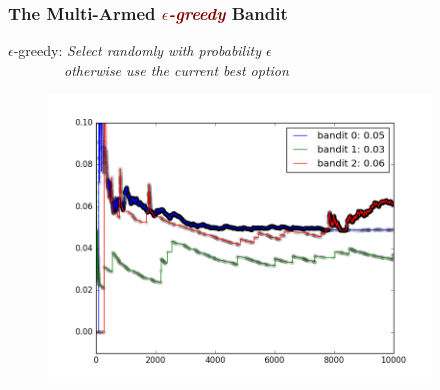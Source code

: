 \documentclass[xcolor={dvipsnames}]{beamer}
\begin{document}
\frame
{
\frametitle{The Multi-Armed  \textcolor{Maroon}{\emph{$\epsilon$-greedy}} Bandit}

$\epsilon$-greedy: \emph{Select randomly with probability $\epsilon$ \\$\quad\quad\quad\quad$otherwise use the current best  option} 

\begin{figure}
\centering
\noindent \includegraphics[height=3in]{stuff/mab_epg.png}
\end{figure}

}
\end{document}
